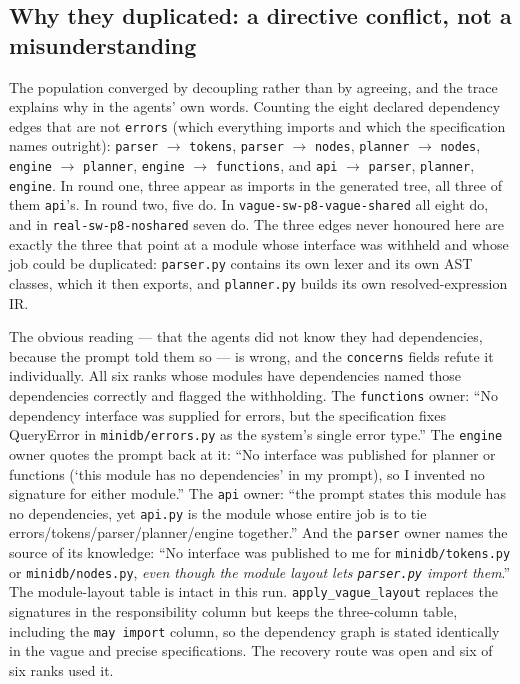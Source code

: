 \documentclass[11pt]{article}
\begin{document}
\subsection{Why they duplicated: a directive conflict, not a misunderstanding}

The population converged by decoupling rather than by agreeing, and the trace explains why in the
agents' own words. Counting the eight declared dependency edges that are not \texttt{errors}
(which everything imports and which the specification names outright): \texttt{parser}
$\rightarrow$ \texttt{tokens}, \texttt{parser} $\rightarrow$ \texttt{nodes}, \texttt{planner}
$\rightarrow$ \texttt{nodes}, \texttt{engine} $\rightarrow$ \texttt{planner}, \texttt{engine}
$\rightarrow$ \texttt{functions}, and \texttt{api} $\rightarrow$ \texttt{parser},
\texttt{planner}, \texttt{engine}. In round one, three appear as imports in the generated tree,
all three of them \texttt{api}'s. In round two, five do. In \texttt{vague-sw-p8-vague-shared} all
eight do, and in \texttt{real-sw-p8-noshared} seven do. The three edges never honoured here are
exactly the three that point at a module whose interface was withheld and whose job could be
duplicated: \texttt{parser.py} contains its own lexer and its own AST classes, which it then
exports, and \texttt{planner.py} builds its own resolved-expression IR.

The obvious reading --- that the agents did not know they had dependencies, because the prompt
told them so --- is wrong, and the \texttt{concerns} fields refute it individually. All six ranks
whose modules have dependencies named those dependencies correctly and flagged the withholding.
The \texttt{functions} owner: ``No dependency interface was supplied for errors, but the
specification fixes QueryError in \texttt{minidb/errors.py} as the system's single error type.''
The \texttt{engine} owner quotes the prompt back at it: ``No interface was published for planner
or functions (`this module has no dependencies' in my prompt), so I invented no signature for
either module.'' The \texttt{api} owner: ``the prompt states this module has no dependencies, yet
\texttt{api.py} is the module whose entire job is to tie errors/tokens/parser/planner/engine
together.'' And the \texttt{parser} owner names the source of its knowledge: ``No interface was
published to me for \texttt{minidb/tokens.py} or \texttt{minidb/nodes.py}, \emph{even though the
module layout lets \texttt{parser.py} import them}.'' The module-layout table is intact in this
run. \texttt{apply\_vague\_layout} replaces the signatures in the responsibility column but keeps
the three-column table, including the \texttt{may import} column, so the dependency graph is
stated identically in the vague and precise specifications. The recovery route was open and six
of six ranks used it.
\end{document}
